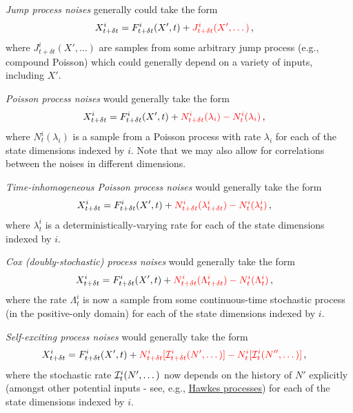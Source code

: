 \documentclass{book}
\begin{document}
\emph{Jump process noises} generally could take the form
\begin{align}
& X^i_{t+\delta t} = F^i_{t+\delta t}(X', t) + \textcolor{red}{J^i_{t+\delta t}(X', \dots )}\,,
\end{align}
where $J^i_{t+\delta t}(X', \dots )$ are samples from some arbitrary jump process (e.g., compound Poisson) which could generally depend on a variety of inputs, including $X'$. 

\emph{Poisson process noises} would generally take the form
\begin{align}
& X^i_{t+\delta t} = F^i_{t+\delta t}(X', t) + \textcolor{red}{N^i_{t+\delta t}({\lambda_i})-N^i_{t}({\lambda_i})}\,,
\end{align}
where $N^i_{t}({\lambda_i})$ is a sample from a Poisson process with rate $\lambda_i$ for each of the state dimensions indexed by $i$. Note that we may also allow for correlations between the noises in different dimensions.

\emph{Time-inhomogeneous Poisson process noises} would generally take the form
\begin{align}
& X^i_{t+\delta t} = F^i_{t+\delta t}(X', t) + \textcolor{red}{N^i_{t+\delta t}({\lambda^i_{t+\delta t}})-N^i_{t}({\lambda^i_t})}\,,
\end{align}
where $\lambda^i_{t}$ is a deterministically-varying rate for each of the state dimensions indexed by $i$.

\emph{Cox (doubly-stochastic) process noises} would generally take the form
\begin{align}
& X^i_{t+\delta t} = F^i_{t+\delta t}(X', t) + \textcolor{red}{N^i_{t+\delta t}({\Lambda^i_{t+\delta t}})-N^i_{t}({\Lambda^i_{t}})}\,,
\end{align}
where the rate $\Lambda^i_{t}$ is now a sample from some continuous-time stochastic process (in the positive-only domain) for each of the state dimensions indexed by $i$.

\emph{Self-exciting process noises} would generally take the form
\begin{align}
& X^i_{t+\delta t} = F^i_{t+\delta t}(X', t) + \textcolor{red}{N^i_{t+\delta t}[{\cal I}^i_{t+\delta t}(N', \dots)]-N^i_{t}[{\cal I}^i_{t}(N'', \dots)]}\,,
\end{align}
where the stochastic rate ${\cal I}^i_{t}(N', \dots)$ now depends on the history of $N'$ explicitly (amongst other potential inputs - see, e.g., \href{https://en.wikipedia.org/wiki/Hawkes_process}{Hawkes processes}) for each of the state dimensions indexed by $i$.
\end{document}
